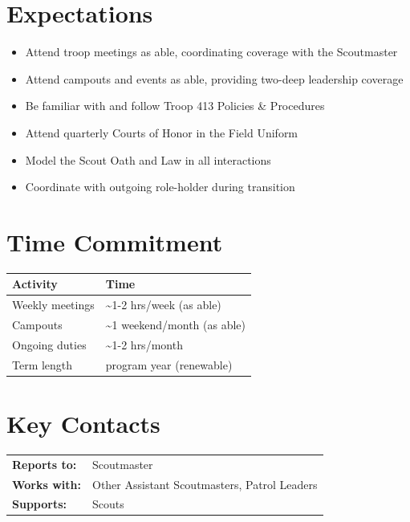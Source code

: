 \documentclass[11pt, letterpaper]{article}
\begin{document}
\begin{minipage}[t]{0.48\linewidth}
\end{minipage}
\hfill
\begin{minipage}[t]{0.48\linewidth}
\raggedright

\section{Expectations}
\begin{itemize}
  \item Attend troop meetings as able, coordinating coverage with the Scoutmaster
  \item Attend campouts and events as able, providing two-deep leadership coverage
  \item Be familiar with and follow Troop 413 Policies \& Procedures
  \item Attend quarterly Courts of Honor in the Field Uniform
  \item Model the Scout Oath and Law in all interactions
  \item Coordinate with outgoing role-holder during transition
\end{itemize}

\section{Time Commitment}
\begin{tabular}{@{}p{3.0cm} >{\raggedright\arraybackslash}p{3.8cm}@{}}
  \toprule
  \textbf{Activity} & \textbf{Time} \\
  \midrule
  Weekly meetings   & \textasciitilde{}1-2 hrs/week (as able) \\
  Campouts          & \textasciitilde{}1 weekend/month (as able) \\
  Ongoing duties    & \textasciitilde{}1-2 hrs/month \\
  Term length       & 1 program year (renewable) \\
  \bottomrule
\end{tabular}

\vspace{1em}

\section{Key Contacts}
\begin{tabular}{@{}p{2.6cm} >{\raggedright\arraybackslash}p{4.2cm}@{}}
  \textbf{Reports to:}  & Scoutmaster \\
  \textbf{Works with:}  & Other Assistant Scoutmasters, Patrol Leaders \\
  \textbf{Supports:}    & Scouts \\
\end{tabular}

\end{minipage}
\end{document}
